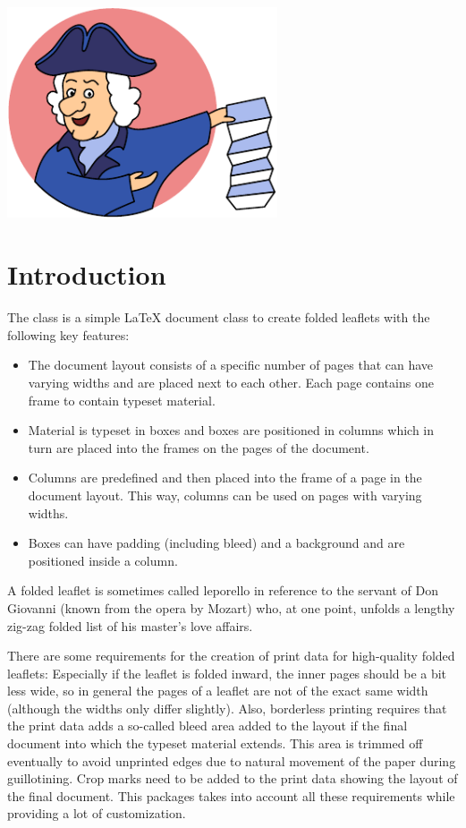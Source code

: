 \documentclass[a4paper]{article}
\begin{document}
\vspace*{-2.5em}
\noindent\hspace{-10pt}
\includegraphics[width=80mm]{doc/leporello.pdf}
\bigskip

\printdoctitle
\bigskip

\section{Introduction}

The  class is a simple LaTeX document class to create folded leaflets with the following key features:

\begin{itemize}
  \item The document layout consists of a specific number of pages that can have varying widths and are placed next to each other. Each page contains one frame to contain typeset material.
  \item Material is typeset in boxes and boxes are positioned in columns which in turn are placed into the frames on the pages of the document.
  \item Columns are predefined and then placed into the frame of a page in the document layout. This way, columns can be used on pages with varying widths.
  \item Boxes can have padding (including bleed) and a background and are positioned inside a column.
\end{itemize}

A folded leaflet is sometimes called leporello in reference to the servant of Don Giovanni (known from the opera by Mozart) who, at one point, unfolds a lengthy zig-zag folded list of his master's love affairs.

There are some requirements for the creation of print data for high-quality folded leaflets: Especially if the leaflet is folded inward, the inner pages should be a bit less wide, so in general the pages of a leaflet are not of the exact same width (although the widths only differ slightly). Also, borderless printing requires that the print data adds a so-called bleed area added to the layout if the final document into which the typeset material extends. This area is trimmed off eventually to avoid unprinted edges due to natural movement of the paper during guillotining. Crop marks need to be added to the print data showing the layout of the final document. This packages takes into account all these requirements while providing a lot of customization.
\end{document}
